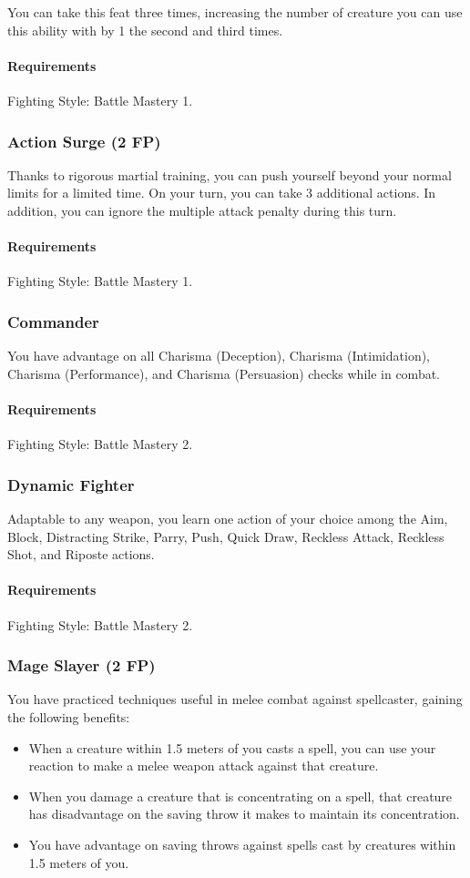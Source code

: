     You can take this feat three times, increasing the number of creature you can use this ability with by 1 the second and third times.
    \paragraph{Requirements} Fighting Style: Battle Mastery 1.
\subsubsection{Action Surge (2 FP)} \label{feat::actionsurge}
    Thanks to rigorous martial training, you can push yourself beyond your normal limits for a limited time.
    On your turn, you can take 3 additional actions.
    In addition, you can ignore the multiple attack penalty during this turn.
    \paragraph{Requirements} Fighting Style: Battle Mastery 1.
\subsubsection{Commander} \label{feat::commander}
    You have advantage on all Charisma (Deception), Charisma (Intimidation), Charisma (Performance), and Charisma (Persuasion) checks while in combat.
    \paragraph{Requirements} Fighting Style: Battle Mastery 2.
\subsubsection{Dynamic Fighter} \label{feat::dynamicfighter}
    Adaptable to any weapon, you learn one action of your choice among the Aim, Block, Distracting Strike, Parry, Push, Quick Draw, Reckless Attack, Reckless Shot, and Riposte actions.
    \paragraph{Requirements} Fighting Style: Battle Mastery 2.
\subsubsection{Mage Slayer (2 FP)} \label{feat::mageslayer}
    You have practiced techniques useful in melee combat against spellcaster, gaining the following benefits:
    \begin{itemize}
        \item When a creature within 1.5 meters of you casts a spell, you can use your reaction to make a melee weapon attack against that creature.
        \item When you damage a creature that is concentrating on a spell, that creature has disadvantage on the saving throw it makes to maintain its concentration.
        \item You have advantage on saving throws against spells cast by creatures within 1.5 meters of you.
    \end{itemize}

